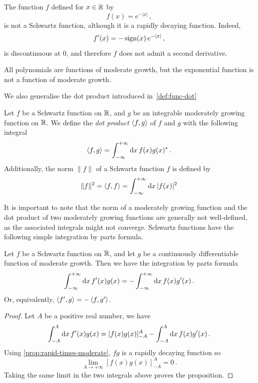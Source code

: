 \begin{example}
	The function $f$ defined for $x\in\mathbb{R}$ by
	\begin{equation}
		f(x)=e^{-|x|}\,,
	\end{equation}
	is not a Schwartz function, although it is a rapidly decaying function. Indeed,
	\begin{equation}
		f'(x)=-\operatorname{sign}(x)\,e^{-|x|}\,,
	\end{equation}
	is discontinuous at $0$, and therefore $f$ does not admit a second derivative.
\end{example}
\begin{example}
	All polynomials are functions of moderate growth, but the exponential function is not a
	function of moderate growth.
\end{example}
We also generalise the dot product introduced in~\cref{def:func-dot}
\begin{definition}
	Let $f$ be a Schwartz function on $\mathbb{R}$, and $g$ be an integrable moderately growing
	function on $\mathbb{R}$. We define the \emph{dot product} $\braket{f,g}$ of $f$ and $g$ with
	the following integral
	\begin{equation}
		\braket{f,g}=\int_{-\infty}^{+\infty}\mathrm{d}{x}\,f(x)g(x)^*\,.
	\end{equation}
	Additionally, the norm $\|f\|$ of a Schwartz function $f$ is defined by
	\begin{equation}
		\|f\|^2=\braket{f,f}=\int_{-\infty}^{+\infty}\mathrm{d}{x}\,|f(x)|^2
	\end{equation}
\end{definition}
It is important to note that the norm of a moderately growing function and the dot product
of two moderately growing functions are generally not well-defined, as the associated
integrals might not converge. Schwartz functions have the following simple integration by
parts formula.
\begin{proposition}
	\label{prop:schwartz-partint}
	Let $f$ be a Schwartz function on $\mathbb{R}$, and let $g$ be a continuously differentiable
	function of moderate growth. Then we have the integration by parts formula
	\begin{equation}
		\int_{-\infty}^{+\infty}\mathrm{d}{x}\,f'(x)g(x)=-\int_{-\infty}^{+\infty}\mathrm{d}{x}\,f(x)g'(x)\,.
	\end{equation}
	Or, equivalently, $\braket{f',g}=-\braket{f,g'}$.
\end{proposition}
\begin{proof}
	Let $A$ be a positive real number, we have
	\begin{equation}
		\int_{-A}^A\mathrm{d} x\,f'(x)g(x)=[f(x)g(x)]_{-A}^A-\int_{-A}^A\mathrm{d} x\,f(x)g'(x)\,.
	\end{equation}
	Using \cref{prop:rapid-times-moderate}, $fg$ is a rapidly decaying function so
	\begin{equation}
		\lim_{A\to+\infty}[f(x)g(x)]_{-A}^A=0\,.
	\end{equation}
	Taking the same limit in the two integrals above proves the proposition.
\end{proof}
